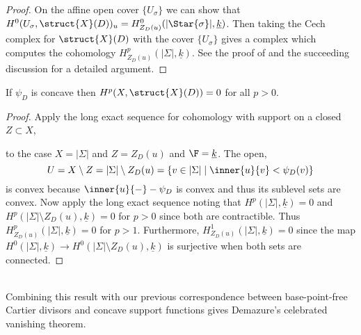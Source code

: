 \begin{proof}
On the affine open cover $\{ U_\sigma \}$ we can show that $H^0(U_\sigma, \struct{X}(D))_u = H^0_{Z_D(u)}(|\Star{\sigma}|, \underline{k})$. Then taking the Cech complex for $\struct{X}(D)$ with the cover $\{ U_\sigma \}$ gives a complex which computes the cohomology $H^p_{Z_D(u)}(|\Sigma|, \underline{k})$. 
See the proof of \cite[Thm. 9.1.2]{cox} and the succeeding discussion for a detailed argument.
\end{proof}

\begin{corollary}
If $\psi_D$ is concave then $H^p(X, \struct{X}(D)) = 0$ for all $p > 0$. 
\end{corollary}

\begin{proof}
Apply the long exact sequence for cohomology with support on a closed $Z \subset X$,
\begin{center}
\end{center}
to the case $X = | \Sigma |$ and $Z = Z_D(u)$ and $\F = \underline{k}$. The open, 
\[ U = X \setminus Z = |\Sigma| \setminus Z_D(u) = \{ v \in |\Sigma| \mid \inner{u}{v} < \psi_D(v) \} \]
is convex because $\inner{u}{-} - \psi_D$ is convex and thus its sublevel sets are convex. Now apply the long exact sequence noting that $H^p(|\Sigma|, \underline{k}) = 0$ and $H^p(|\Sigma| \setminus Z_D(u), \underline{k}) = 0$ for $p > 0$ since both are contractible. Thus $H^p_{Z_D(u)}(|\Sigma|, \underline{k}) = 0$ for $p > 1$. Furthermore, $H^1_{Z_D(u)}(|\Sigma|, \underline{k}) = 0$ since the map $H^0(|\Sigma|, \underline{k}) \to H^0(|\Sigma| \setminus Z_D(u), \underline{k})$ is surjective when both sets are connected. 
\end{proof}
\noindent\\
Combining this result with our previous correspondence between base-point-free Cartier divisors and concave support functions gives Demazure's celebrated vanishing theorem.

